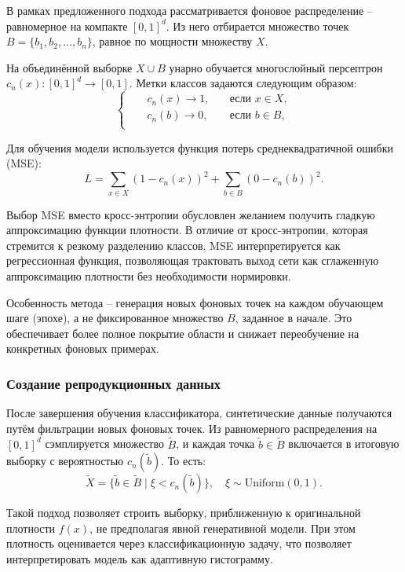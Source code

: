 В рамках предложенного подхода рассматривается фоновое распределение -- равномерное на компакте \([0, 1]^d\). Из него отбирается множество точек \(B = \{b_1, b_2, \dots, b_n\}\), равное по мощности множеству \(X\).

На объединённой выборке \(X \cup B\) унарно обучается многослойный персептрон \(c_n(x): [0, 1]^d \to [0, 1]\). Метки классов задаются следующим образом:
\[
\left\{
\begin{alignedat}{2}
    &&c_n(x) \rightarrow 1, \quad &\text{если } x \in X, \\
    &&c_n(b) \rightarrow 0, \quad &\text{если } b \in B, \\
\end{alignedat}
\right.
\]

Для обучения модели используется функция потерь среднеквадратичной ошибки (MSE):
\[
L = \sum_{x \in X} (1 - c_n(x))^2 + \sum_{b \in B} (0 - c_n(b))^2.
\]

Выбор MSE вместо кросс-энтропии обусловлен желанием получить гладкую аппроксимацию функции плотности. В отличие от кросс-энтропии, которая стремится к резкому разделению классов, MSE интерпретируется как регрессионная функция, позволяющая трактовать выход сети как сглаженную аппроксимацию плотности без необходимости нормировки.

Особенность метода -- генерация новых фоновых точек на каждом обучающем шаге (эпохе), а не фиксированное множество \(B\), заданное в начале. Это обеспечивает более полное покрытие области и снижает переобучение на конкретных фоновых примерах.

\subsubsection{Создание репродукционных данных}

После завершения обучения классификатора, синтетические данные получаются путём фильтрации новых фоновых точек. Из равномерного распределения на \([0, 1]^d\) сэмплируется множество \(\tilde{B}\), и каждая точка \(\tilde{b} \in \tilde{B}\) включается в итоговую выборку с вероятностью \(c_n(\tilde{b})\). То есть:
\[
\tilde{X} = \{ \tilde{b} \in \tilde{B} \mid \xi < c_n(\tilde{b}) \}, \quad \xi \sim \text{Uniform}(0,1).
\]

Такой подход позволяет строить выборку, приближенную к оригинальной плотности \( f(x) \), не предполагая явной генеративной модели. При этом плотность оценивается через классификационную задачу, что позволяет интерпретировать модель как адаптивную гистограмму.


